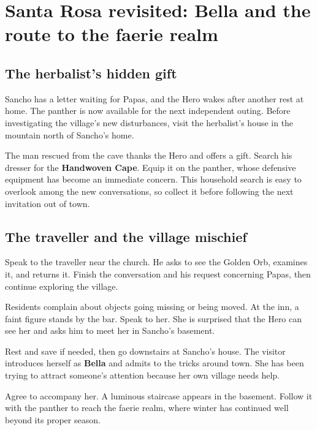 \section{Santa Rosa revisited: Bella and the route to the faerie realm}

\subsection*{The herbalist's hidden gift}

Sancho has a letter waiting for Papas, and the Hero wakes after another
rest at home. The panther is now available for the next independent
outing. Before investigating the village's new disturbances, visit
the herbalist's house in the mountain north of Sancho's home.

The man rescued from the cave thanks the Hero and offers a gift.
Search his dresser for the \textbf{Handwoven Cape}. Equip it on the
panther, whose defensive equipment has become an immediate concern.
This household search is easy to overlook among the new conversations,
so collect it before following the next invitation out of town.


\subsection*{The traveller and the village mischief}

Speak to the traveller near the church. He asks to see the Golden Orb,
examines it, and returns it. Finish the conversation and his request
concerning Papas, then continue exploring the village.

Residents complain about objects going missing or being moved. At the
inn, a faint figure stands by the bar. Speak to her. She is surprised
that the Hero can see her and asks him to meet her in Sancho's basement.

Rest and save if needed, then go downstairs at Sancho's house. The visitor
introduces herself as \textbf{Bella} and admits to the tricks around
town. She has been trying to attract someone's attention because her
own village needs help.

Agree to accompany her. A luminous staircase appears in the basement.
Follow it with the panther to reach the faerie realm, where winter has
continued well beyond its proper season.

